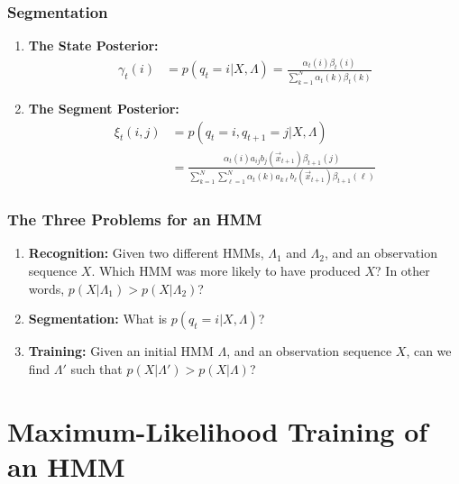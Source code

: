 \documentclass{beamer}
\begin{document}
\begin{frame}
  \frametitle{Segmentation}

  \begin{enumerate}
  \item {\bf The State Posterior:}
    \begin{align*}
      \gamma_t(i) & = p(q_t=i|X,\Lambda)
      = \frac{\alpha_t(i)\beta_t(i)}{\sum_{k=1}^N\alpha_t(k)\beta_t(k)}
    \end{align*}
  \item {\bf The Segment Posterior:}
    \begin{align*}
      \xi_t(i,j) & = p(q_t=i,q_{t+1}=j|X,\Lambda)\\
      &= \frac{\alpha_t(i)a_{ij}b_j(\vec{x}_{t+1})\beta_{t+1}(j)}{\sum_{k=1}^N\sum_{\ell=1}^N\alpha_t(k)a_{k\ell}b_\ell(\vec{x}_{t+1})\beta_{t+1}(\ell)}
    \end{align*}
  \end{enumerate}
\end{frame}


\begin{frame}
  \frametitle{The Three Problems for an HMM}

  \begin{enumerate}
  \item {\bf Recognition:} Given two different HMMs, $\Lambda_1$ and
    $\Lambda_2$, and an observation sequence $X$.  Which HMM was more
    likely to have produced $X$?  In other words, 
    $p(X|\Lambda_1)>p(X|\Lambda_2)$?
  \item {\bf Segmentation:} What is $p(q_t=i|X,\Lambda)$?
  \item {\bf Training:} Given an initial HMM $\Lambda$, and an
    observation sequence $X$, can we find $\Lambda'$ such that
    $p(X|\Lambda') > p(X|\Lambda)$?
  \end{enumerate}
\end{frame}


\section[ML]{Maximum-Likelihood  Training of an HMM}
\setcounter{subsection}{1}
\end{document}
